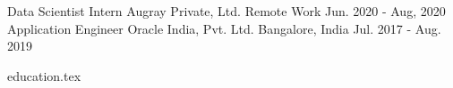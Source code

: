 \documentclass[12pt, a4paper]{awesome-cv}
\newcommand*{\sectiondir}{resume/}
\begin{document}
\vspace{-2.0ex}
\begin{cventries}
\cventry
    {Data Scientist Intern}
    {Augray Private, Ltd.}
    {Remote Work}
    {Jun. 2020 - Aug, 2020}
    {}
\cventry
    {Application Engineer}
    {Oracle India, Pvt. Ltd.}
    {Bangalore, India}
    {Jul. 2017 - Aug. 2019}
    {}
\end{cventries}

\vspace{-2.0ex}
{education.tex}
\end{document}
